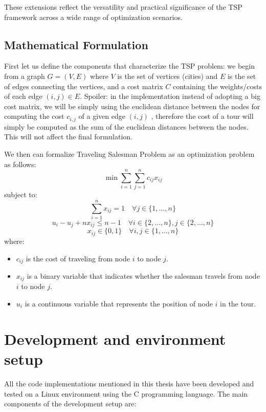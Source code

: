 \documentclass{article}
\begin{document}
These extensions reflect the versatility and practical significance of the TSP framework across a wide range of optimization scenarios.


\subsection{Mathematical Formulation}
First let us define the components that characterize the TSP problem: we begin from a graph $G = (V, E)$ where $V$ is the set of vertices (cities) and $E$ is the set of edges connecting the vertices, and a cost matrix $C$ containing the weights/costs of each edge $(i, j) \in E$. 
Spoiler: in the implementation instead of adopting a big cost matrix, we will be simply using the euclidean distance between the nodes for computing the cost $c_{i, j}$ of a given edge $(i, j)$ , therefore the cost of a tour will simply be computed as the sum of the euclidean distances between the nodes. This will not affect the final formulation.   

We then can formalize Traveling Salesman Problem  as an optimization problem as follows:
\begin{equation}
	\min \sum_{i=1}^{n} \sum_{j=1}^{n} c_{ij} x_{ij}
\end{equation}
subject to:
\begin{equation}
	\sum_{i=1}^{n} x_{ij} = 1 \quad \forall j \in \{1, \ldots, n\}
\end{equation}
\begin{equation}
	u_i - u_j + nx_{ij} \leq n-1 \quad \forall i \in \{2, \ldots, n\}, j \in \{2, \ldots, n\}
\end{equation}
\begin{equation}
	x_{ij} \in \{0, 1\} \quad \forall i, j \in \{1, \ldots, n\}
\end{equation}
where:
\begin{itemize}
	\item $c_{ij}$ is the cost of traveling from node $i$ to node $j$.
	\item $x_{ij}$ is a binary variable that indicates whether the salesman travels from node $i$ to node $j$.
	\item $u_i$ is a continuous variable that represents the position of node $i$ in the tour.
\end{itemize}


\newpage

\section{Development and environment setup}
All the code implementations mentioned in this thesis have been developed and tested on a Linux environment using the C programming language. The main components of the development setup are:
\end{document}
